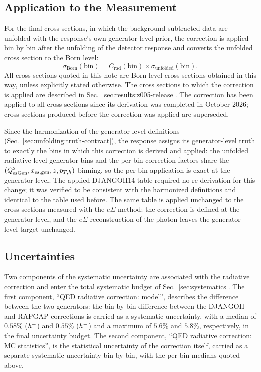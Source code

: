 \subsection{Application to the Measurement}
\label{sec:radiative_corrections:application}

For the final cross sections, in which the background-subtracted data are
unfolded with the response's own generator-level prior, the correction is
applied bin by bin
after the unfolding of the detector response and converts the unfolded cross
section to the Born level:
\begin{equation}
  \sigma_{\mathrm{Born}}(\mathrm{bin}) =
  C_{\mathrm{rad}}(\mathrm{bin}) \times
  \sigma_{\mathrm{unfolded}}(\mathrm{bin}).
\end{equation}
All cross sections quoted in this note are Born-level cross sections
obtained in this way, unless explicitly stated otherwise.  The cross sections
to which the correction is applied are described in
Sec.~\ref{sec:results:z005-release}.  The correction has been applied to
all cross sections since its derivation was completed in
October 2026; cross sections produced before the correction was applied
are superseded.

Since the harmonization of the generator-level definitions
(Sec.~\ref{sec:unfolding:truth-contract}), the response assigns its
generator-level truth to exactly the bins in which this correction is
derived and applied: the unfolded radiative-level generator bins and the
per-bin correction factors share the
$(Q^2_{\mathrm{esGen}},x_{\mathrm{es,gen}},z,p_{T,h})$ binning, so the per-bin
application is exact at the generator level.  The applied DJANGOH14 table
required no re-derivation for this change; it was verified to be consistent
with the harmonized definitions and identical to the table used before.  The
same table is applied unchanged to the cross sections measured with the
$e\Sigma$ method: the correction is defined at the generator level, and the
$e\Sigma$ reconstruction of the photon leaves the generator-level target
unchanged.

\subsection{Uncertainties}
\label{sec:radiative_corrections:uncertainties}

Two components of the systematic uncertainty are associated with the
radiative correction and enter the total systematic budget of
Sec.~\ref{sec:systematics}.  The first component, ``QED radiative
correction: model'', describes the difference between the two generators:
the bin-by-bin difference between the DJANGOH and RAPGAP corrections is
carried as a systematic uncertainty, with a median of $0.58\%$ ($h^{+}$)
and $0.55\%$ ($h^{-}$) and a maximum of $5.6\%$ and $5.8\%$,
respectively, in the final uncertainty budget.  The second component, ``QED
radiative correction: MC statistics'', is the statistical uncertainty of the
correction itself, carried as a separate
systematic uncertainty bin by bin, with the per-bin medians quoted
above.

